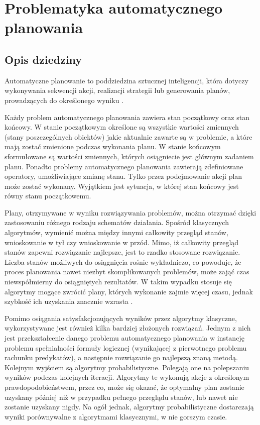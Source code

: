 \chapter{Problematyka automatycznego planowania}
 \section{Opis dziedziny}
 \label{sec:opis}
Automatyczne planowanie to poddziedzina sztucznej inteligencji, która dotyczy wykonywania sekwencji akcji, realizacji strategii lub generowania planów, prowadzących do określonego wyniku \cite{planning}.

Każdy problem automatycznego planowania zawiera stan początkowy oraz stan końcowy. W stanie początkowym określone są wszystkie wartości zmiennych (stany poszczególnych obiektów) jakie aktualnie zawarte są w problemie, a które mają zostać zmienione podczas wykonania planu. W stanie końcowym sformułowane są wartości zmiennych, których osiągniecie jest głównym zadaniem planu. Ponadto problemy automatycznego planowania zawierają zdefiniowane operatory, umożliwiające zmianę stanu. Tylko przez podejmowanie akcji plan może zostać wykonany. Wyjątkiem jest sytuacja, w której stan końcowy jest równy stanu początkowemu.

Plany, otrzymywane w wyniku rozwiązywania problemów, można otrzymać dzięki zastosowaniu różnego rodzaju schematów działania. Spośród klasycznych algorytmów, wymienić można między innymi całkowity przegląd stanów, wnioskowanie w tył czy wnioskowanie w przód. Mimo, iż całkowity przegląd stanów zapewni rozwiązanie najlepsze, jest to rzadko stosowane rozwiązanie. Liczba stanów możliwych do osiągnięcia rośnie wykładniczo, co powoduje, że proces planowania nawet niezbyt skomplikowanych problemów, może zająć czas niewspółmierny do osiągniętych rezultatów. W takim wypadku stosuje się algorytmy mogące zwrócić plany, których wykonanie zajmie więcej czasu, jednak szybkość ich uzyskania znacznie wzrasta \cite{fdalgorytm}.

Pomimo osiągania satysfakcjonujących wyników przez algorytmy klasyczne, wykorzystywane jest również kilka bardziej złożonych rozwiązań. Jednym z nich jest przekształcenie danego problemu automatycznego planowania w instancję problemu spełnialności formuły logicznej (wynikającej z pierwotnego problemu rachunku predykatów), a następnie  rozwiązanie go najlepszą znaną metodą. Kolejnym wyjściem są algorytmy probabilistyczne. Polegają one na polepszaniu wyników podczas kolejnych iteracji. Algorytmy te wykonują akcje z określonym prawdopodobieństwem, przez co, może się okazać, że optymalny plan zostanie uzyskany później niż w przypadku pełnego przeglądu stanów, lub nawet nie zostanie uzyskany nigdy. Na ogół jednak, algorytmy probabilistyczne dostarczają wyniki porównywalne z algorytmami klasycznymi, w nie gorszym czasie.

